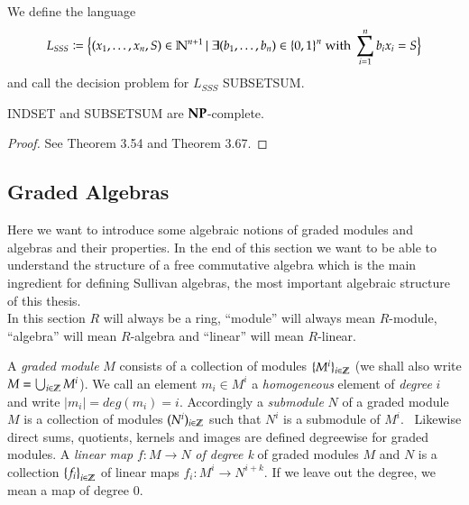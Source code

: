 \begin{Problem}
 We define the language
 $$ L_{SSS} \coloneqq {\big{\lbrace} (x_1, \ldots, x_n, S) \in \mathbb{N}^{n+1} \, | \;
 \exists (b_1, \ldots, b_n) \in {\lbrace 0,1 \rbrace}^n  \; \text{with} \; \sum_{i = 1}^n b_i x_i = S \big{\rbrace}} $$
 and call the decision problem for $L_{SSS}$ SUBSETSUM.
\end{Problem}



\begin{Theorem}
 INDSET and SUBSETSUM are $\mathbf{NP}$-complete.
\end{Theorem}

\begin{proof}
 See \cite{JorgRothe2008} Theorem 3.54 and Theorem 3.67.
\end{proof}

 
 
\subsection{Graded Algebras}

Here we want to introduce some algebraic notions of graded modules and algebras and their properties. In the end of 
this section we want to be able to understand the structure of a free commutative algebra which is the main ingredient 
for defining Sullivan algebras, the most important algebraic structure of this thesis.
\\

In this section $R$ will always be a ring, ``module'' will
always mean $R$-module, ``algebra'' will mean $R$-algebra and ``linear'' will mean $R$-linear.


\begin{Definition}

A \emph{graded module} $M$ consists of a collection of modules $ {\lbrace M^i \rbrace}_{i \in \mathbb{Z}}$ (we shall also write
$M = \bigcup_{i \in \mathbb{Z}} M^i$). We call an element 
$m_i \in M^i$ a \emph{homogeneous} element of \emph{degree} $i$ and write $|m_i| = deg (m_i) = i$. Accordingly a \emph{submodule} $N$ of
a graded module $M$ is a collection of modules $(N^i)_{i \in \mathbb{Z}}$ such that $N^i$ is a submodule of $M^i$. \
Likewise direct sums, quotients, kernels and images are defined degreewise for graded modules. \newline
A \emph{linear map}  $f \colon M \to N$ \emph{of degree k} of graded modules $M$ and $N$ is a collection 
${\lbrace f_i \rbrace}_{i \in \mathbb{Z}}$ of
linear maps $f_i \colon M^i \to N^{i + k}$. If we leave out the degree, we mean a map of degree $0$.
\end{Definition}

